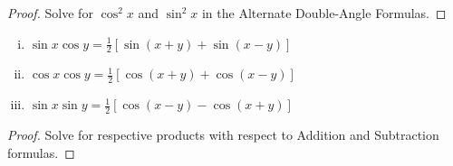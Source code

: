\documentclass[a4paper,8pt]{article}
\begin{document}
\begin{outline}
    \begin{proof}
      Solve for \(\cos^2 x\) and \(\sin^2 x\) in the Alternate Double-Angle Formulas.
    \end{proof}

    \begin{enumerate}[i.]
      \item \(\sin{x}\cos{y} = \frac{1}{2}\left[\sin{(x+y)} + \sin{(x-y)}\right]\)
      \item \(\cos{x}\cos{y} = \frac{1}{2}\left[\cos{(x+y)} + \cos{(x-y)}\right]\)
      \item \(\sin{x}\sin{y} = \frac{1}{2}\left[\cos{(x-y)} - \cos{(x+y)}\right]\)
    \end{enumerate}

    \begin{proof}
      Solve for respective products with respect to Addition and Subtraction formulas.
    \end{proof}

\end{outline}
\end{document}
